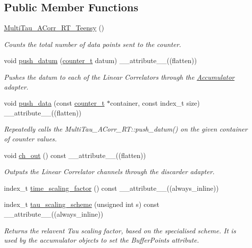 \subsection*{Public Member Functions}
\begin{DoxyCompactItemize}
\item 
\hyperlink{classMultiTau__ACorr__RT__Teensy_a28cfdcd7468aac93693a4d4803fc95f9}{Multi\+Tau\+\_\+\+A\+Corr\+\_\+\+R\+T\+\_\+\+Teensy} ()
\begin{DoxyCompactList}\small\item\em Counts the total number of data points sent to the counter. \end{DoxyCompactList}\item 
void \hyperlink{classMultiTau__ACorr__RT__Teensy_a1ad6126310c987f53a0ec7ab3ae03a12}{push\+\_\+datum} (\hyperlink{types_8hpp_ac89ac912f524b3e3fa3720ea55fec966}{counter\+\_\+t} datum) \+\_\+\+\_\+attribute\+\_\+\+\_\+((flatten))
\begin{DoxyCompactList}\small\item\em Pushes the datum to each of the Linear Correlators through the \hyperlink{classAccumulator}{Accumulator} adapter. \end{DoxyCompactList}\item 
void \hyperlink{classMultiTau__ACorr__RT__Teensy_ae36ab4fb6f646d068e638ab7e4ec9da8}{push\+\_\+data} (const \hyperlink{types_8hpp_ac89ac912f524b3e3fa3720ea55fec966}{counter\+\_\+t} $\ast$container, const index\+\_\+t size) \+\_\+\+\_\+attribute\+\_\+\+\_\+((flatten))
\begin{DoxyCompactList}\small\item\em Repeatedly calls the Multi\+Tau\+\_\+\+A\+Corr\+\_\+\+R\+T\+::push\+\_\+datum() on the given container of counter values. \end{DoxyCompactList}\item 
void \hyperlink{classMultiTau__ACorr__RT__Teensy_a37a29725971f15305398ac7c9c360eac}{ch\+\_\+out} () const \+\_\+\+\_\+attribute\+\_\+\+\_\+((flatten))
\begin{DoxyCompactList}\small\item\em Outputs the Linear Correlator channels through the discarder adapter. \end{DoxyCompactList}\item 
index\+\_\+t \hyperlink{classMultiTau__ACorr__RT__Teensy_a218fdc2fcc3bb7cd5d1c2f03ea2506da}{time\+\_\+scaling\+\_\+factor} () const \+\_\+\+\_\+attribute\+\_\+\+\_\+((always\+\_\+inline))
\item 
index\+\_\+t \hyperlink{classMultiTau__ACorr__RT__Teensy_af90bc219b8b9dc316c56efd7c74aae6f}{tau\+\_\+scaling\+\_\+scheme} (unsigned int s) const \+\_\+\+\_\+attribute\+\_\+\+\_\+((always\+\_\+inline))
\begin{DoxyCompactList}\small\item\em Returns the relavent Tau scaling factor, based on the specialised scheme. It is used by the accumulator objects to set the Buffer\+Points attribute. \end{DoxyCompactList}\end{DoxyCompactItemize}
